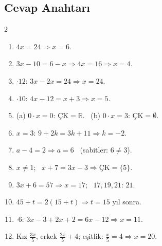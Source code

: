 \subsection*{Cevap Anahtarı}
{\small
\begin{multicols}{2}
\begin{enumerate}[label=\textbf{\arabic*.},leftmargin=*,itemsep=1pt]
\item \(4x=24\Rightarrow x=6\).
\item \(3x-10=6-x\Rightarrow 4x=16\Rightarrow x=4\).
\item \(\cdot 12\): \(3x-2x=24\Rightarrow x=24\).
\item \(\cdot 10\): \(4x-12=x+3\Rightarrow x=5\).
\item (a) \(0\cdot x=0\): \(\text{ÇK}=\mathbb{R}\). \ (b) \(0\cdot x=3\): \(\text{ÇK}=\emptyset\).
\item \(x=3\): \(9+2k=3k+11\Rightarrow k=-2\).
\item \(a-4=2\Rightarrow a=6\) \ (sabitler: \(6\neq 3\)).
\item \(x\neq 1\); \ \(x+7=3x-3\Rightarrow \text{ÇK}=\{5\}\).
\item \(3x+6=57\Rightarrow x=17\); \ \(17,19,21\): \(21\).
\item \(45+t=2(15+t)\Rightarrow t=15\) yıl sonra.
\item \(\cdot 6\): \(3x-3+2x+2=6x-12\Rightarrow x=11\).
\item Kız \(\frac{3x}{5}\), erkek \(\frac{2x}{5}+4\); eşitlik: \(\frac{x}{5}=4\Rightarrow x=20\).
\end{enumerate}
\end{multicols}}
